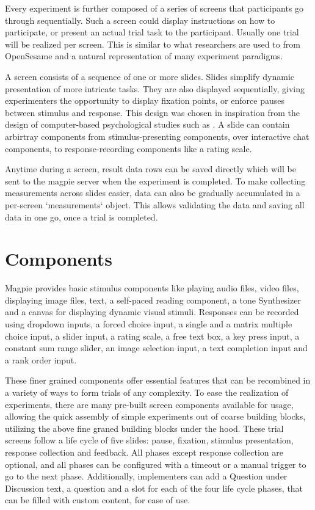 \documentclass[a4paper,11pt]{scrreprt}
\begin{document}
Every experiment is further composed of a series of screens that participants go through sequentially. Such a screen could display instructions on how to participate, or present an actual trial task to the participant. Usually one trial will be realized per screen. This is similar to what researchers are used to from OpenSesame \citep{Mathot2012} and a natural representation of many experiment paradigms.

A screen consists of a sequence of one or more slides. Slides simplify dynamic presentation of more intricate tasks. They are also displayed sequentially, giving experimenters the opportunity to display fixation points, or enforce pauses between stimulus and response. This design was chosen in inspiration from the design of computer-based psychological studies such as \cite{Todd2004}. A slide can contain arbirtray components from stimulus-presenting components, over interactive chat components, to response-recording components like a rating scale.

Anytime during a screen, result data rows can be saved directly which will be sent to the magpie server when the experiment is completed. To make collecting measurements across slides easier, data can also be gradually accumulated in a per-screen `measurements` object. This allows validating the data and saving all data in one go, once a trial is completed.

\section{Components}
Magpie provides basic stimulus components like playing audio files, video files, displaying image files, text, a self-paced reading component, a tone Synthesizer and a canvas for displaying dynamic visual stimuli. Responses can be recorded using dropdown inputs, a forced choice input, a single and a matrix multiple choice input, a slider input, a rating scale, a free text box, a key press input, a constant sum range slider, an image selection input, a text completion input and a rank order input.

These finer grained components offer essential features that can be recombined in a variety of ways to form trials of any complexity.
To ease the realization of experiments, there are many pre-built screen components available for usage, allowing the quick assembly of simple experiments out of coarse building blocks, utilizing the above fine graned building blocks under the hood. These trial screens follow a life cycle of five slides: pause, fixation, stimulus presentation, response collection and feedback. All phases except response collection are optional, and all phases can be configured with a timeout or a manual trigger to go to the next phase. Additionally, implementers can add a Question under Discussion text, a question and a slot for each of the four life cycle phases, that can be filled with custom content, for ease of use.
\end{document}
